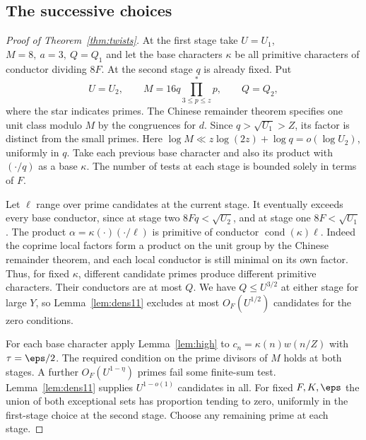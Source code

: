 \documentclass[a4paper,11pt]{article}
\theoremstyle{definition}
\theoremstyle{remark}
\numberwithin{equation}{section}
\begin{document}
\subsection{The successive choices}\label{nav:I-20}
\begin{proof}[Proof of Theorem~\ref{thm:twists}]
At the first stage take \(U=U_1\), \(M=8,\ a=3,\ Q=Q_1\) and let the base characters \(\kappa\) be all primitive characters of conductor dividing \(8F\). At the second stage \(q\) is already fixed. Put
\[
 U=U_2,\qquad M=16q\prod_{3\le p\le z}^{*}p,\qquad Q=Q_2 ,
\]
where the star indicates primes. The Chinese remainder theorem specifies one unit class modulo \(M\) by the congruences for \(d\). Since \(q>\sqrt{U_1}>Z\), its factor is distinct from the small primes. Here \(\log M\ll z\log(2z)+\log q=o(\log U_2)\), uniformly in \(q\). Take each previous base character and also its product with \((\cdot/q)\) as a base \(\kappa\). The number of tests at each stage is bounded solely in terms of \(F\).

Let \(\ell\) range over prime candidates at the current stage. It eventually exceeds every base conductor, since at stage two \(8Fq<\sqrt{U_2}\), and at stage one \(8F<\sqrt{U_1}\). The product \(\alpha=\kappa(\cdot)(\cdot/\ell)\) is primitive of conductor \(\operatorname{cond}(\kappa)\ell\). Indeed the coprime local factors form a product on the unit group by the Chinese remainder theorem, and each local conductor is still minimal on its own factor. Thus, for fixed \(\kappa\), different candidate primes produce different primitive characters. Their conductors are at most \(Q\). We have \(Q\le U^{3/2}\) at either stage for large \(Y\), so Lemma~\ref{lem:dens11} excludes at most \(O_F(U^{1/2})\) candidates for the zero conditions.

For each base character apply Lemma~\ref{lem:high} to \(c_n=\kappa(n)w(n/Z)\) with \(\tau=\eps/2\). The required condition on the prime divisors of \(M\) holds at both stages. A further \(O_F(U^{1-\eta})\) primes fail some finite-sum test. Lemma~\ref{lem:dens11} supplies \(U^{1-o(1)}\) candidates in all. For fixed \(F,K,\eps\) the union of both exceptional sets has proportion tending to zero, uniformly in the first-stage choice at the second stage. Choose any remaining prime at each stage.


\end{proof}
\end{document}
